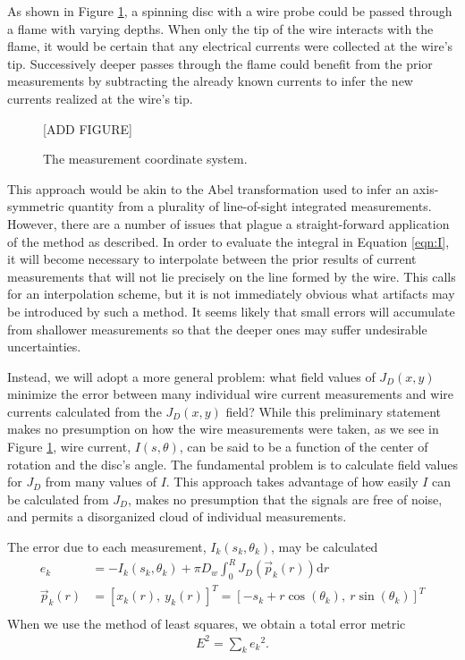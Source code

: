 As shown in Figure \ref{fig:coordinate}, a spinning disc with a wire probe could be passed through a flame with varying depths.  When only the tip of the wire interacts with the flame, it would be certain that any electrical currents were collected at the wire's tip.  Successively deeper passes through the flame could benefit from the prior measurements by subtracting the already known currents to infer the new currents realized at the wire's tip. 

\begin{figure}
\begin{center}
[ADD FIGURE]
\caption{The measurement coordinate system.}\label{fig:coordinate}
\end{center}
\end{figure}

This approach would be akin to the Abel transformation used to infer an axis-symmetric quantity from a plurality of line-of-sight integrated measurements.  However, there are a number of issues that plague a straight-forward application of the method as described.  In order to evaluate the integral in Equation \ref{eqn:I}, it will become necessary to interpolate between the prior results of current measurements that will not lie precisely on the line formed by the wire.  This calls for an interpolation scheme, but it is not immediately obvious what artifacts may be introduced by such a method.  It seems likely that small errors will accumulate from shallower measurements so that the deeper ones may suffer undesirable uncertainties.

Instead, we will adopt a more general problem: what field values of $J_D(x,y)$ minimize the error between many individual wire current measurements and wire currents calculated from the $J_D(x,y)$ field?  While this preliminary statement makes no presumption on how the wire measurements were taken, as we see in Figure \ref{fig:coordinate}, wire current, $I(s,\theta)$, can be said to be a function of the center of rotation and the disc's angle.  The fundamental problem is to calculate field values for $J_D$ from many values of $I$.  This approach takes advantage of how easily $I$ can be calculated from $J_D$, makes no presumption that the signals are free of noise, and permits a disorganized cloud of individual measurements.

The error due to each measurement, $I_k(s_k, \theta_k)$, may be calculated
\begin{subequations}\label{eqn:ek}
\begin{align}
e_k &= - I_k\left(s_k, \theta_k\right) + \pi D_w \int_0^R J_D\left(\vec{p}_k(r)\right) \mathrm{d} r\\
\vec{p}_k(r) &= [x_k(r),\ y_k(r)]^T = [-s_k + r\cos(\theta_k),\ r\sin(\theta_k)]^T\\
\end{align}
\end{subequations}
When we use the method of least squares, we obtain a total error metric
\begin{align}
E^2 = \sum_k e_k{^2}.
\end{align}


